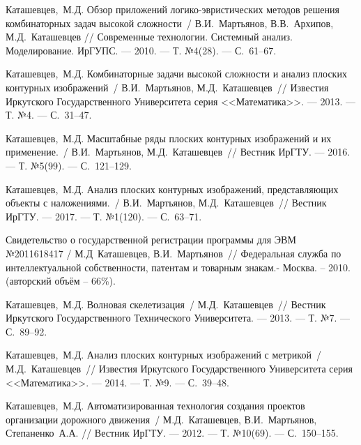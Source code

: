 \renewcommand{\refname}{Список основных работ по теме диссертации}
\begin{thebibliography}{10}

 Каташевцев,~М.Д. Обзор приложений
  логико-эвристических методов решения
  комбинаторных задач высокой сложности~/ В.И.~Мартьянов, В.В.~Архипов, М.Д.~Каташевцев //
  Современные технологии. Системный анализ.
  Моделирование. ИрГУПС. --- 2010. --- Т. №4(28). --- {С.}~61--67.{}

 Каташевцев,~М.Д. Комбинаторные задачи высокой сложности и
  анализ плоских контурных изображений~/
  В.И.~Мартьянов, М.Д.~Каташевцев~// Известия
  Иркутского Государственного
  Университета серия <<Математика>>.
--- 2013.
--- Т. №4.
--- {С.}~31--47.{}

 Каташевцев,~М.Д. Масштабные ряды плоских контурных
  изображений и их применение.~/
  В.И.~Мартьянов, М.Д.~Каташевцев~// Вестник
  ИрГТУ.
--- 2016.
--- Т. №5(99).
--- {С.}~121--129.{}

 Каташевцев,~М.Д. Анализ плоских контурных изображений,
  представляющих объекты с наложениями.~/
  В.И.~Мартьянов, М.Д.~Каташевцев~// Вестник
  ИрГТУ.
--- 2017.
--- Т. №1(120).
--- {С.}~63--71.{}

Свидетельство о
  государственной регистрации программы
  для ЭВМ №2011618417  / М.Д~Каташевцев, В.И.~Мартьянов~// Федеральная служба по
    интеллектуальной собственности, патентам
    и товарным знакам.- Москва. -- 2010. (авторский объём – 66\%).

 Каташевцев,~М.Д. Волновая скелетизация~/ М.Д.~Каташевцев~//
  Вестник Иркутского Государственного
  Технического Университета.
--- 2013.
--- Т. №7.
--- {С.}~89--92.{}

 Каташевцев,~М.Д. Анализ плоских контурных изображений с
  метрикой~/ М.Д.~Каташевцев~// Известия
  Иркутского Государственного
  Университета серия <<Математика>>.
--- 2014.
--- Т. №9.
--- {С.}~39--48.{}

 Каташевцев,~М.Д. Автоматизированная технология создания
  проектов организации дорожного
  движения~/ М.Д.~Каташевцев, В.И.~Мартьянов,
    Степаненко~А.А. // Вестник ИрГТУ.
--- 2012.
--- Т. №10(69).
--- {С.}~150--155.{}


\end{thebibliography}
